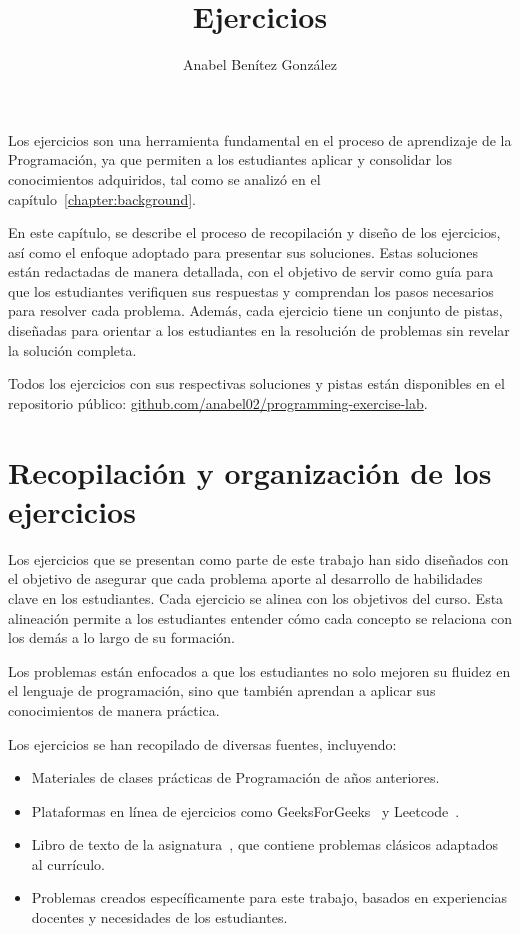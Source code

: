 \documentclass{article}
\title{Ejercicios}
\author{Anabel Benítez González}
\date{}
\begin{document}

\maketitle

Los ejercicios son una herramienta fundamental en el proceso de aprendizaje de la Programación, ya que permiten a los estudiantes aplicar y consolidar los conocimientos adquiridos, tal como se analizó en el capítulo~\ref{chapter:background}.

En este capítulo, se describe el proceso de recopilación y diseño de los ejercicios, así como el enfoque adoptado para presentar sus soluciones. Estas soluciones están redactadas de manera detallada, con el objetivo de servir como guía para que los estudiantes verifiquen sus respuestas y comprendan los pasos necesarios para resolver cada problema. Además, cada ejercicio tiene un conjunto de pistas, diseñadas para orientar a los estudiantes en la resolución de problemas sin revelar la solución completa.

Todos los ejercicios con sus respectivas soluciones y pistas están disponibles en el repositorio público: \href{https://github.com/anabel02/programming-exercise-lab}{github.com/anabel02/programming-exercise-lab}.

\section{Recopilación y organización de los ejercicios}

Los ejercicios que se presentan como parte de este trabajo han sido diseñados con el objetivo de asegurar que cada problema aporte al desarrollo de habilidades clave en los estudiantes. Cada ejercicio se alinea con los objetivos del curso. Esta alineación permite a los estudiantes entender cómo cada concepto se relaciona con los demás a lo largo de su formación.

Los problemas están enfocados a que los estudiantes no solo mejoren su fluidez en el lenguaje de programación, sino que también aprendan a aplicar sus conocimientos de manera práctica.

Los ejercicios se han recopilado de diversas fuentes, incluyendo:
\begin{itemize}
    \item Materiales de clases prácticas de Programación de años anteriores.
    \item Plataformas en línea de ejercicios como GeeksForGeeks~\cite{geeksforgeeks} y Leetcode~\cite{leetcode}.
    \item Libro de texto de la asignatura~\cite{katrib_programar}, que contiene problemas clásicos adaptados al currículo.
    \item Problemas creados específicamente para este trabajo, basados en experiencias docentes y necesidades de los estudiantes.
\end{itemize}
\end{document}
